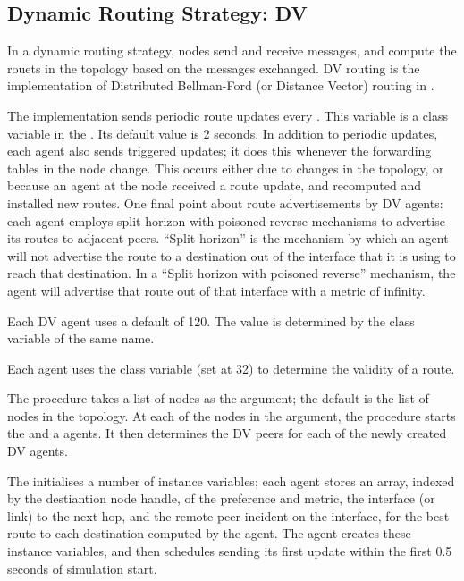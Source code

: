 \documentclass{article}
\begin{document}
\subsection{Dynamic Routing Strategy: DV}
\label{sec:DV}

In a dynamic routing strategy, nodes send and receive messages,
and compute the rouets in the topology based on the messages exchanged.
DV routing is the implementation of Distributed Bellman-Ford (or
Distance Vector) routing in \ns.

The implementation sends periodic route updates every .
This variable is a class variable in the .
Its default value is 2 seconds.
In addition to periodic updates, each agent also sends triggered updates;
it does this whenever the forwarding tables in the node change.
This occurs either due to changes in the topology, 
or because an agent at the node received a route update,
and recomputed and installed new routes.
One final point about route advertisements by DV agents:
each agent employs split horizon with poisoned reverse mechanisms
to advertise its routes to adjacent peers.
``Split horizon'' is the mechanism by which an agent will not advertise
the route to a destination out of the interface that it is using to
reach that destination.
In a ``Split horizon with poisoned reverse'' mechanism,
the agent will advertise that route out of that interface with 
a metric of infinity.

Each DV agent uses a default  of 120.
The value is determined by the class variable of the same name.

Each agent uses the class variable  (set at 32)
to determine the validity of a route.

The procedure
takes a list of nodes as the argument;
the default is the list of nodes in the topology.
At each of the nodes in the argument, the procedure starts the
 and a 
 agents.
It then determines the DV peers for each of the newly created DV agents.

The
initialises a number of instance variables;
each agent stores an array, indexed by the destiantion node handle,
of the preference and metric, the interface (or link) to the next hop,
and the remote peer incident on the interface,
for the best route to each destination computed by the agent.
The agent creates these instance variables, and then
schedules sending its first update within the first
0.5 seconds of simulation start.
\end{document}
